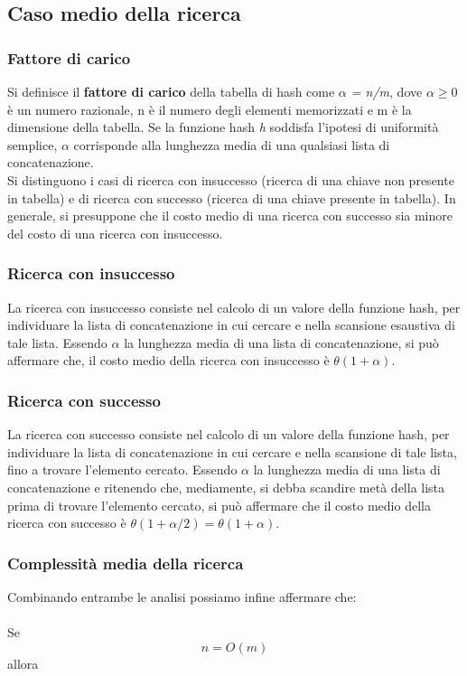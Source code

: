 \documentclass{article}
\begin{document}
\clearpage

\subsection{Caso medio della ricerca}
\subsubsection{Fattore di carico}
Si definisce il \textbf{fattore di carico} della tabella di hash come \textit{$\alpha$ = n/m}, dove $\alpha \geq 0$ è un numero razionale, n è il numero degli elementi memorizzati e m è la dimensione della tabella.
Se la funzione hash \textit{h} soddisfa l’ipotesi di uniformità semplice, $\alpha$ corrisponde alla lunghezza media di una qualsiasi lista di concatenazione. \\

Si distinguono i casi di ricerca con insuccesso (ricerca di una chiave non presente in tabella) e di ricerca con successo (ricerca di una chiave presente in tabella).
In generale, si presuppone che il costo medio di una ricerca con successo sia minore del costo di una ricerca con insuccesso.
\subsubsection{Ricerca con insuccesso}
La ricerca con insuccesso consiste nel calcolo di un valore della funzione hash, per individuare la lista di concatenazione in cui cercare e nella
scansione esaustiva di tale lista. Essendo $\alpha$ la lunghezza media di una lista di concatenazione, si può affermare che, il costo medio della ricerca con insuccesso è $\theta(1 + \alpha)$.
\subsubsection{Ricerca con successo}
La ricerca con successo consiste nel calcolo di un valore della funzione hash, per individuare la lista di concatenazione in cui cercare e nella scansione di tale lista, fino a trovare l’elemento cercato. Essendo $\alpha$ la lunghezza media di una lista di concatenazione e ritenendo che, mediamente, si debba scandire metà della lista prima di trovare l’elemento cercato, si può affermare che il costo medio della ricerca con successo è $\theta(1 + \alpha/2) = \theta(1 + \alpha)$.\\
\subsubsection{Complessità media della ricerca}
Combinando entrambe le analisi possiamo infine affermare che: \\ \\
Se \[n = O(m)\] allora
\end{document}
